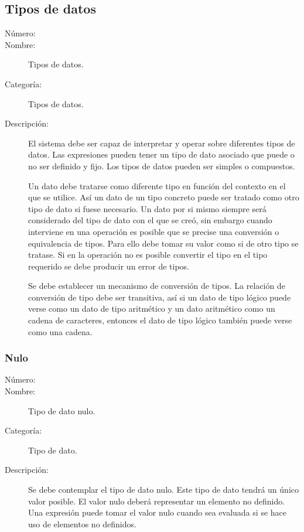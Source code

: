 \subsection{Tipos de datos}

	\begin{description}
		\item [Número:] \cn
		\item [Nombre:] Tipos de datos.
		\item [Categoría:] Tipos de datos.
		\item [Descripción:] El sistema debe ser capaz de interpretar y operar sobre diferentes tipos de datos. Las expresiones
		pueden tener un tipo de dato asociado que puede o no ser definido y fijo. Los tipos de datos pueden ser simples o compuestos.
		
		Un dato debe tratarse como diferente tipo en función del contexto en el que se utilice. Así un dato de un tipo concreto puede ser tratado como
		otro tipo de dato si fuese necesario. Un dato por si mismo siempre será considerado del tipo de dato con el que se creó, sin embargo
		cuando interviene en una operación es posible que se precise una conversión o equivalencia de tipos. Para ello debe tomar su valor como si de otro
		tipo se tratase. Si en la operación no es posible convertir el tipo en el tipo requerido se debe producir un error de tipos.
      
		Se debe establecer un mecanismo de conversión de tipos. La relación de conversión de tipo debe ser transitiva, así
		si un dato de tipo lógico puede verse como un dato de tipo aritmético y un dato aritmético como un cadena de caracteres, entonces el
		dato de tipo lógico también puede verse como una cadena.
   \end {description}

\subsubsection{Nulo}
	\begin{description}
		\item [Número:] \cn
		\item [Nombre:] Tipo de dato nulo.
		\item [Categoría:] Tipo de dato.
		\item [Descripción:] Se debe contemplar el tipo de dato nulo. Este tipo de dato tendrá un único valor 
      posible. El valor nulo deberá representar un elemento no definido. Una expresión puede tomar el
      valor nulo cuando sea evaluada si se hace uso de elementos no definidos.
	\end {description}

